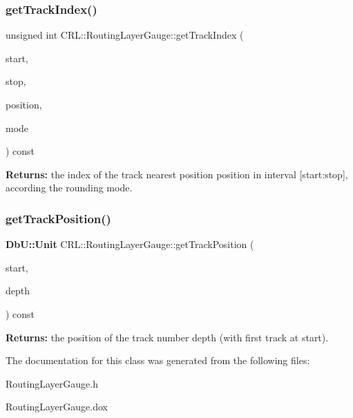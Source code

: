 \subsubsection{\texorpdfstring{get\+Track\+Index()}{getTrackIndex()}}
{\footnotesize\ttfamily unsigned int C\+R\+L\+::\+Routing\+Layer\+Gauge\+::get\+Track\+Index (\begin{DoxyParamCaption}\item[{\textbf{ Db\+U\+::\+Unit}}]{start,  }\item[{\textbf{ Db\+U\+::\+Unit}}]{stop,  }\item[{\textbf{ Db\+U\+::\+Unit}}]{position,  }\item[{unsigned}]{mode }\end{DoxyParamCaption}) const}

{\bfseries Returns\+:} the index of the track nearest position {\ttfamily position} in interval {\ttfamily \mbox{[}start\+:stop\mbox{]}}, according the rounding {\ttfamily mode}. \mbox{\label{classCRL_1_1RoutingLayerGauge_a470828019c5cde566e7aa6d27ef68439}} 
\subsubsection{\texorpdfstring{get\+Track\+Position()}{getTrackPosition()}}
{\footnotesize\ttfamily \textbf{ Db\+U\+::\+Unit} C\+R\+L\+::\+Routing\+Layer\+Gauge\+::get\+Track\+Position (\begin{DoxyParamCaption}\item[{\textbf{ Db\+U\+::\+Unit}}]{start,  }\item[{unsigned}]{depth }\end{DoxyParamCaption}) const}

{\bfseries Returns\+:} the position of the track number {\ttfamily depth} (with first track at {\ttfamily start}). 

The documentation for this class was generated from the following files\+:\begin{DoxyCompactItemize}
\item 
Routing\+Layer\+Gauge.\+h\item 
Routing\+Layer\+Gauge.\+dox\end{DoxyCompactItemize}
